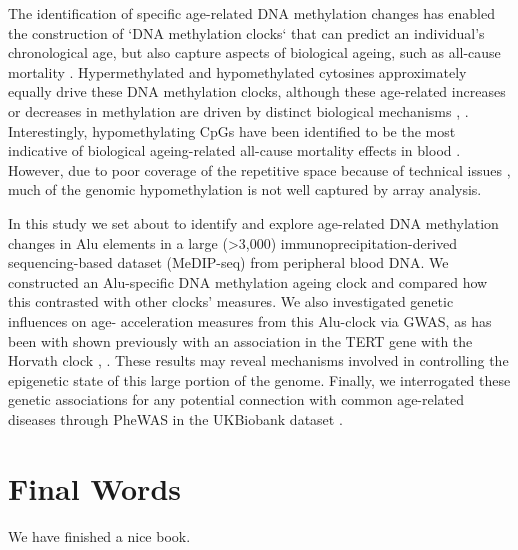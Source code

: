 \documentclass[]{book}
\begin{document}
The identification of specific age-related DNA methylation changes has enabled the construction of `DNA methylation clocks` \citep{Horvath2018} that can predict an individual's chronological age, but also capture aspects of biological ageing, such as all-cause mortality \citep{Marioni2015}.
Hypermethylated and hypomethylated cytosines approximately equally drive these DNA methylation clocks, although these age-related increases or decreases in methylation are driven by distinct biological mechanisms \citep{Mozhui2017}, \citep{Wu2017}.
Interestingly, hypomethylating CpGs have been identified to be the most indicative of biological ageing-related all-cause mortality effects in blood \citep{Zhang2017}.
However, due to poor coverage of the repetitive space because of technical issues \citep{Bell2019}, much of the genomic hypomethylation is not well captured by array analysis.

In this study we set about to identify and explore age-related DNA methylation changes in Alu elements in a large (\textgreater3,000) immunoprecipitation-derived sequencing-based dataset (MeDIP-seq) from peripheral blood DNA. We constructed an Alu-specific DNA methylation ageing clock and compared how this contrasted with other clocks' measures. We also investigated genetic influences on age- acceleration measures from this Alu-clock via GWAS, as has been with shown previously with an association in the TERT gene with the Horvath clock \citep{Lu2017}, \citep{Gibson2019}.
These results may reveal mechanisms involved in controlling the epigenetic state of this large portion of the genome.
Finally, we interrogated these genetic associations for any potential connection with common age-related diseases through PheWAS in the UKBiobank dataset \citep{Bycroft2017}.

\hypertarget{final-words}{%
\chapter{Final Words}\label{final-words}}

We have finished a nice book.


\end{document}
